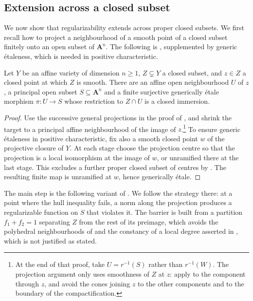 \documentclass[11pt,a4paper]{article}
\begin{document}
\subsection{Extension across a closed subset}\label{subsec:singular-locus}

We now show that regularizability extends across proper closed subsets. We first recall how to project a neighbourhood of a smooth point of a closed subset finitely onto an open subset of $\mathbf A^n$. The following is \cite[Lemma~6.16]{Wu26}, supplemented by generic \'etaleness, which is needed in positive characteristic.

\begin{lemma}\label{lem:projection-existence}
Let $Y$ be an affine variety of dimension $n\ge1$, $Z\subsetneq Y$ a closed subset, and $z\in Z$ a closed point at which $Z$ is smooth. There are an affine open neighbourhood $U$ of $z$, a principal open subset $S\subseteq\mathbf A^n$ and a finite surjective generically \'etale morphism $\pi\colon U\to S$ whose restriction to $Z\cap U$ is a closed immersion.
\end{lemma}

\begin{proof}
Use the successive general projections in the proof of \cite[Lemma~6.16]{Wu26}, and shrink the target to a principal affine neighbourhood of the image of $z$.\footnote{At the end of that proof, take $U=r^{-1}(S)$ rather than $r^{-1}(W)$. The projection argument only uses smoothness of $Z$ at $z$: apply \cite[\href{https://stacks.math.columbia.edu/tag/0B1Q}{Tag 0B1Q}]{Stacks} to the component through $z$, and avoid the cones joining $z$ to the other components and to the boundary of the compactification.} To ensure generic \'etaleness in positive characteristic, fix also a smooth closed point $w$ of the projective closure of $Y$. At each stage choose the projection centre so that the projection is a local isomorphism at the image of $w$, or unramified there at the last stage. This excludes a further proper closed subset of centres by \cite[\href{https://stacks.math.columbia.edu/tag/0B1Q}{Tag 0B1Q}]{Stacks}. The resulting finite map is unramified at $w$, hence generically \'etale.
\end{proof}

The main step is the following variant of \cite[Lemma~6.15]{Wu26}. We follow the strategy there: at a point where the hull inequality fails, a norm along the projection produces a regularizable function on $S$ that violates it. The barrier is built from a partition $f_1+f_2=1$ separating $Z$ from the rest of its preimage, which avoids the polyhedral neighbourhoods of \cite[Lemma~6.15, Step~2]{Wu26} and the constancy of a local degree asserted in \cite[Lemma~6.15, Step~3]{Wu26}, which is not justified as stated.
\end{document}
